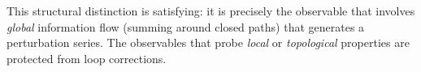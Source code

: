 \documentclass[11pt,a4paper]{article}
\theoremstyle{definition}
\begin{document}
This structural distinction is satisfying: it is precisely the observable that involves \emph{global} information flow (summing around closed paths) that generates a perturbation series. The observables that probe \emph{local} or \emph{topological} properties are protected from loop corrections.




\end{document}
